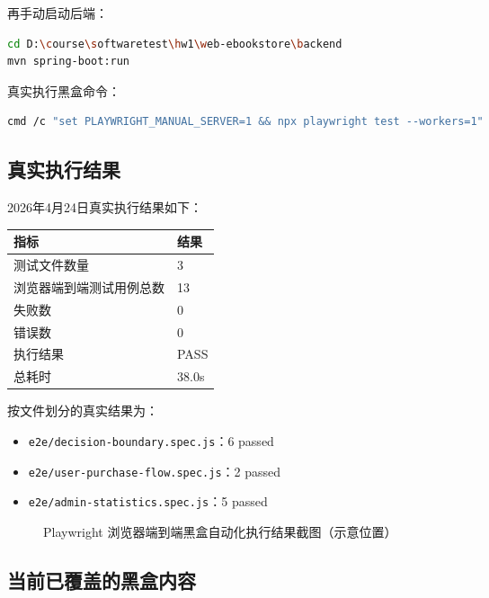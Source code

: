 \documentclass[UTF8,a4paper,12pt]{ctexart}
\begin{document}
再手动启动后端：

\begin{lstlisting}[language=bash]
cd D:\course\softwaretest\hw1\web-ebookstore\backend
mvn spring-boot:run
\end{lstlisting}

真实执行黑盒命令：

\begin{lstlisting}[language=bash]
cmd /c "set PLAYWRIGHT_MANUAL_SERVER=1 && npx playwright test --workers=1"
\end{lstlisting}

\subsection{真实执行结果}

2026年4月24日真实执行结果如下：

\begin{longtable}{p{6cm}p{6cm}}
\toprule
指标 & 结果 \\
\midrule
测试文件数量 & 3 \\
浏览器端到端测试用例总数 & 13 \\
失败数 & 0 \\
错误数 & 0 \\
执行结果 & PASS \\
总耗时 & 38.0s \\
\bottomrule
\end{longtable}

按文件划分的真实结果为：

\begin{itemize}
  \item \texttt{e2e/decision-boundary.spec.js}：6 passed
  \item \texttt{e2e/user-purchase-flow.spec.js}：2 passed
  \item \texttt{e2e/admin-statistics.spec.js}：5 passed
\end{itemize}

\begin{figure}[H]
  \centering
  \caption{Playwright 浏览器端到端黑盒自动化执行结果截图（示意位置）}
\end{figure}

\subsection{当前已覆盖的黑盒内容}
\end{document}
